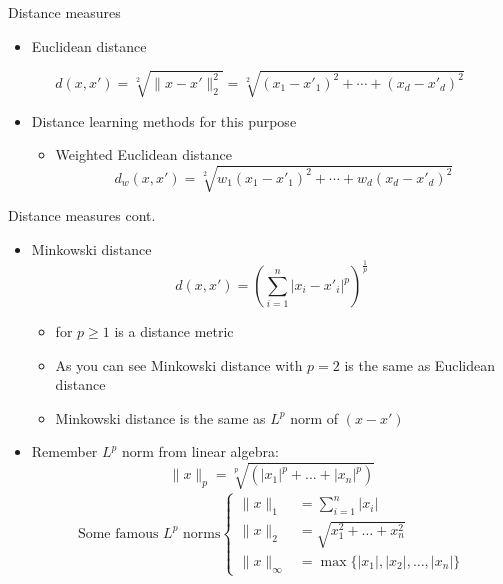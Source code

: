 \documentclass[serif, aspectratio=169]{beamer}
\begin{document}
\begin{frame}{Distance measures}
    \begin{itemize}
        \item Euclidean distance
    \end{itemize}
       \[
          d(x, x') = \sqrt[2]{\|x - x'\|_2^2} = \sqrt[2]{(x_1 - x'_1)^2 + \cdots + (x_d - x'_d)^2}
       \]
    \begin{itemize}
        \item Distance learning methods for this purpose
        \begin{itemize}
            \item Weighted Euclidean distance
             \[
                d_w(x, x') = \sqrt[2]{w_1(x_1 - x'_1)^2 + \cdots + w_d(x_d - x'_d)^2}
             \]
        \end{itemize}
   
    \end{itemize}       
\end{frame}
\begin{frame}{Distance measures cont.}
    \begin{itemize}
         \item Minkowski distance
    \[
    d(x,x') = (\sum _{i=1} ^ n |x_i - x'_i| ^ p ) ^ {\frac{1}{p}}
    \]
        \begin{itemize}
            \item for $p \geq 1$ is a distance metric
            \item As you can see Minkowski distance with $p=2$ is the same as Euclidean distance
            \item Minkowski distance is the same as $L^p$ norm of $(x-x')$
        \end{itemize}
    \item Remember $L^p$ norm from linear algebra:
        \[
            \|x\|_p = \sqrt[p]{(|x_1|^p + \dots + |x_n|^p)}
        \]
        \begin{align*}
            \text{Some famous $L^p$ norms} \begin{cases}
                    \|x\|_1 &= \sum _{i=1}^n |x_i| \\
                    \|x\|_2 &= \sqrt{x_1^2 + \dots + x_n^2} \\
                    \|x\|_{\infty}  &= \max \{|x_1|, |x_2|, \dots, |x_n|\}
                \end{cases}
        \end{align*}
    \end{itemize}
\end{frame}
\end{document}
